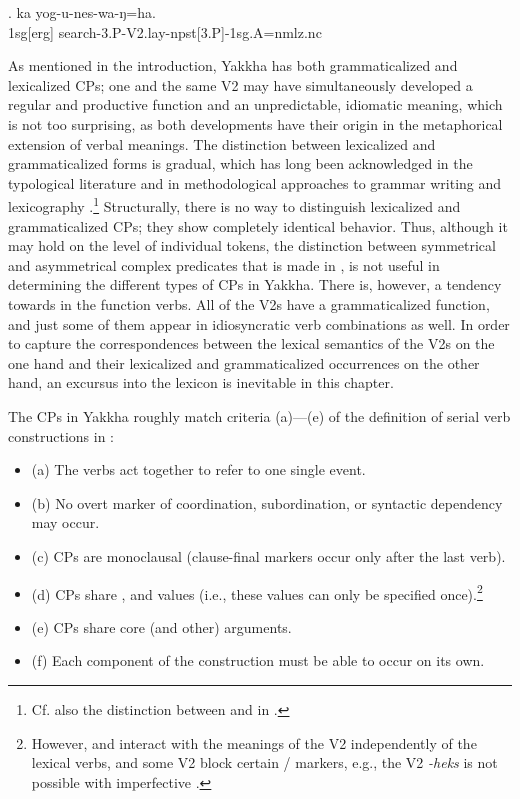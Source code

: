 \exg. ka yog-u-nes-wa-ŋ=ha.\\ 
{\sc 1sg[erg]} search{\sc -3.P-V2.lay-npst[3.P]-1sg.A=nmlz.nc}\\ 
	 

\newpage
 As mentioned in the introduction, Yakkha has both grammaticalized and lexicalized CPs; one and the same V2 may have simultaneously developed a regular and productive function and an unpredictable, idiomatic meaning, which is not too surprising, as both developments have their origin in the metaphorical extension of verbal meanings. The distinction between lexicalized and grammaticalized forms is gradual, which has long been acknowledged in the typological literature  \citep{Lehmann2002_Thoughts, Diewald2010_Some, Lichtenberk1991_Gradualness, Himmelmann2004_Lexicalization} and in methodological approaches to grammar writing and lexicography \citep{Schultze-Berndt2006_Taking, Mosel2006_Grammaticography, Enfield2006_Heterosemy}.\footnote{Cf. also the distinction between  and  in \citet{Svensen2009_Handbook}.} Structurally, there is no way to distinguish lexicalized and grammaticalized CPs; they show completely identical behavior. Thus, although it may hold on the level of individual tokens, the distinction between symmetrical and asymmetrical complex predicates that is made in \citet{Aikhenvald2006_Serial},  is not useful in determining the different types of CPs in Yakkha. There is, however, a tendency towards  in the function verbs. All of the V2s have a grammaticalized function, and just some of them appear in idiosyncratic verb combinations as well. In order to capture the correspondences between the lexical semantics of the V2s on the one hand and their lexicalized and grammaticalized occurrences on the other hand, an excursus into the lexicon is inevitable in this chapter. 
 
The CPs in Yakkha roughly match criteria (a)—(e) of the definition of serial verb constructions in \citet[1]{Aikhenvald2006_Serial}: 


\begin{itemize}
\item (a) The verbs act together to refer to one single event.
\item (b) No overt marker of coordination, subordination, or syntactic dependency may occur.
\item (c) CPs are monoclausal (clause-final markers occur only after the last verb).
\item (d) CPs share ,  and  values (i.e., these values can only be specified once).\footnote{However,  and  interact with the meanings of the V2 independently of the lexical verbs, and some V2 block certain / markers, e.g., the  V2 \emph{-heks}  is not possible with imperfective .}
\item (e) CPs share core (and other) arguments.
\item (f) Each component of the construction must be able to occur on its own.
\end{itemize}



